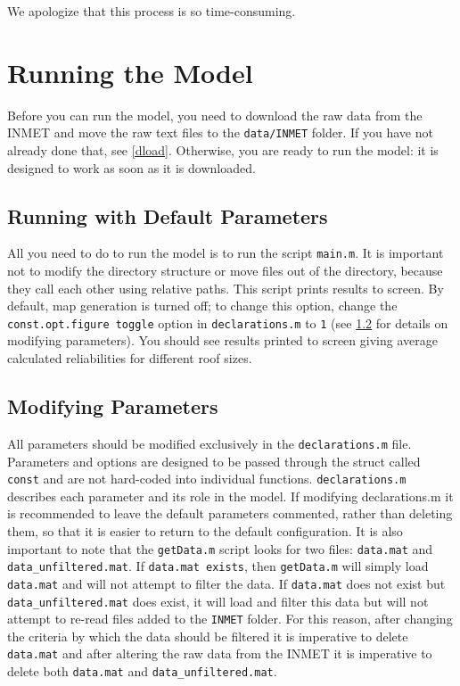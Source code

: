 \documentclass[11pt]{article} %
\newcommand{\fn}[1]{\texttt{#1}} %
\newcommand{\code}[1]{\texttt{#1}} %
\begin{document}
We apologize that this process is so time-consuming.


\section{Running the Model}

Before you can run the model, you need to download the raw data from the \ac{INMET} and move the raw text files to the \fn{data/INMET} folder.
If you have not already done that, see \cref{dload}.
Otherwise, you are ready to run the model: it is designed to work as soon as it is downloaded.

\subsection{Running with Default Parameters} \label{defparam}

All you need to do to run the model is to run the script \fn{main.m}.
It is  important not to modify the directory structure or move files out of the directory, because they call each other using relative paths.
This script prints results to screen.
By default, map generation is turned off; to change this option, change the \code{const.opt.figure toggle} option in \fn{declarations.m} to \code{1} (see \cref{modparam} for details on modifying parameters).
You should see results printed to screen giving average calculated reliabilities for different roof sizes.

\subsection{Modifying Parameters} \label{modparam}

All parameters should be modified exclusively in the \fn{declarations.m} file.
Parameters and options are designed to be passed through the struct called \code{const} and are not hard-coded into individual functions. 
\fn{declarations.m} describes each parameter and its role in the model.
If modifying {declarations.m} it is recommended to leave the default parameters commented, rather than deleting them, so that it is easier to return to the default configuration.
It is also important to note that the \fn{getData.m} script looks for two files: \fn{data.mat} and \fn{data\_unfiltered.mat}. 
If \fn{data.mat exists}, then \fn{getData.m} will simply load \fn{data.mat} and will not attempt to filter the data.
If \fn{data.mat} does not exist but \fn{data\_unfiltered.mat} does exist, it will load and filter this data but will not attempt to re-read files added to the \fn{INMET} folder.
For this reason, after changing the criteria by which the data should be filtered it is imperative to delete \fn{data.mat} and after altering the raw data from the \ac{INMET} it is imperative to delete both \fn{data.mat} and \fn{data\_unfiltered.mat}.
\end{document}
